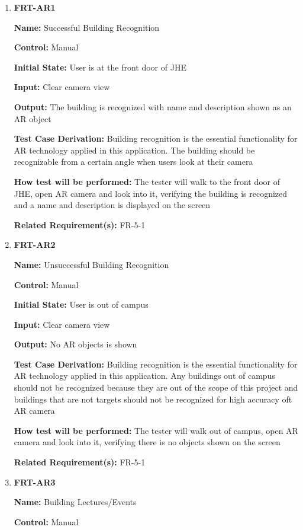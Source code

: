 \documentclass[12pt, titlepage]{article}
\begin{document}
\begin{enumerate}
\item{\textbf{FRT-AR1}}

\textbf{Name:} Successful Building Recognition

\textbf{Control:} Manual
					
\textbf{Initial State:} User is at the front door of JHE

\textbf{Input:} Clear camera view
					
\textbf{Output:} The building is recognized with name and description shown as an AR object

\textbf{Test Case Derivation:} Building recognition is the essential functionality for AR technology applied in this application. The building should be recognizable from a certain angle when users look at their camera
					
\textbf{How test will be performed:} The tester will walk to the front door of JHE, open AR camera and look into it, verifying the building is recognized and a name and description is displayed on the screen

\textbf{Related Requirement(s):} FR-5-1

\item{\textbf{FRT-AR2}}

\textbf{Name:} Unsuccessful Building Recognition

\textbf{Control:} Manual
					
\textbf{Initial State:} User is out of campus

\textbf{Input:} Clear camera view
					
\textbf{Output:} No AR objects is shown

\textbf{Test Case Derivation:} Building recognition is the essential functionality for AR technology applied in this application. Any buildings out of campus should not be recognized because they are out of the scope of this project and buildings that are not targets should not be recognized for high accuracy oft AR camera
					
\textbf{How test will be performed:} The tester will walk out of campus, open AR camera and look into it, verifying there is no objects shown on the screen

\textbf{Related Requirement(s):} FR-5-1

\item{\textbf{FRT-AR3}}

\textbf{Name:} Building Lectures/Events

\textbf{Control:} Manual
					

\end{enumerate}
\end{document}
